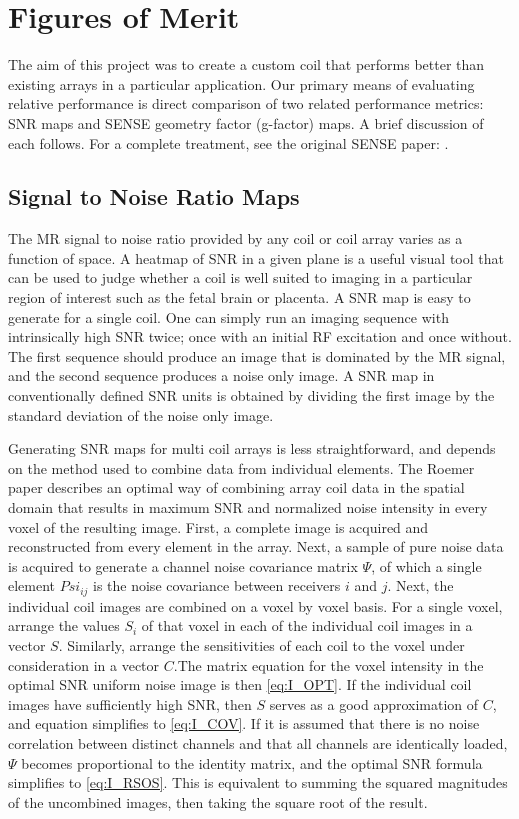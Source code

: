 \chapter{Figures of Merit}
The aim of this project was to create a custom coil that performs better than existing arrays in a
particular application. Our primary means of evaluating relative performance is direct comparison of two related
performance metrics: SNR maps and SENSE geometry factor (g-factor) maps. A brief discussion of each follows. For a
complete treatment, see the original SENSE paper: \cite{Pruessmann1999}.

\section{Signal to Noise Ratio Maps}
The MR signal to noise ratio provided by any coil or coil array varies as a function
of space. A heatmap of SNR in a given plane is a useful visual tool that can be used to judge whether a coil is well
suited to imaging in a particular region of interest such as the fetal brain or placenta. A SNR map is easy to generate
for a single coil. One can simply run an imaging sequence with intrinsically high SNR twice; once with an initial RF
excitation and once without. The first sequence should produce an image that is dominated by the MR signal, and the
second sequence produces a noise only image. A SNR map in conventionally defined SNR units is obtained by dividing the
first image by the standard deviation of the noise only image.

Generating SNR maps for multi coil arrays is less straightforward, and depends on the method used to combine data from
individual elements. The Roemer paper \cite{Roemer90} describes an optimal way of combining array coil data in the
spatial domain that results in maximum SNR and normalized noise intensity in every voxel of the resulting image.  First,
a complete image is acquired and reconstructed from every element in the array. Next, a sample of pure noise data is
acquired to generate a channel noise covariance matrix $\Psi$, of which a single element $Psi_{ij}$ is the noise
covariance between receivers $i$ and $j$. Next, the individual coil images are combined on a voxel by voxel basis. For a
single voxel, arrange the values $S_i$ of that voxel in each of the individual coil images in a vector $S$.  Similarly,
arrange the sensitivities of each coil to the voxel under consideration in a vector $C$.The matrix equation for the
voxel intensity in the optimal SNR uniform noise image is then \ref{eq:I_OPT}. If the individual coil images have
sufficiently high SNR, then $S$ serves as a good approximation of $C$, and equation simplifies to \ref{eq:I_COV}.  If it
is assumed that there is no noise correlation between distinct channels and that all channels are identically loaded,
$\Psi$ becomes proportional to the identity matrix, and the optimal SNR formula simplifies to \ref{eq:I_RSOS}. This is
equivalent to summing the squared magnitudes of the uncombined images, then taking the square root of the result.

